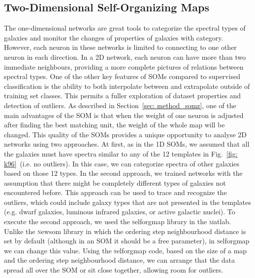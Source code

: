         
    
      
    \subsection{Two-Dimensional Self-Organizing Maps}
    \label{sec: 2D}
        The one-dimensional networks are great tools to categorize the spectral types of galaxies and monitor the changes of properties of galaxies with category.
        However, each neuron in these networks is limited to connecting to one other neuron in each direction.
        In a 2D network, each neuron can have more than two immediate neighbours, providing a more complete pictures of relations between spectral types.
        One of the other key features of SOMs compared to supervised classification is the ability to both interpolate between and extrapolate outside of training set classes.
        This permits a fuller exploration of dataset properties and detection of outliers.
        As described in Section~\ref{sec: method_somz}, one of the main advantages of the SOM is that when the weight of one neuron is adjusted after finding the best matching unit, the weight of the whole     map will be changed.
        This quality of the SOMs provides a unique opportunity to analyse 2D networks using two approaches. 
        At first, as in the 1D SOMs, we assumed that all the galaxies must have spectra similar to any of the 12 templates in Fig.~\ref{fig: k96}~(i.e. no outliers).
        In this case, we can categorize spectra of other galaxies based on those 12 types.
        In the second approach, we trained networks with the assumption that there might be completely different types of galaxies not encountered before.
        This approach can be used to trace and recognize the outliers, which could include galaxy types that are not presented in the  templates (e.g. dwarf galaxies, luminous infrared galaxies, or active galactic nuclei).
        To execute the second approach, we used the {\textsc selforgmap} library in the {\textsc matlab}.
        Unlike the {\textsc newsom} library in which the ordering step neighbourhood distance is set by default (although in an SOM it should be a free parameter), in {\textsc selforgmap} we can change this value.
        Using the {\textsc selforgmap} code, based on the size of a map and the ordering step neighbourhood distance, we can arrange that the data spread all over the SOM or sit close together, allowing room for outliers.

